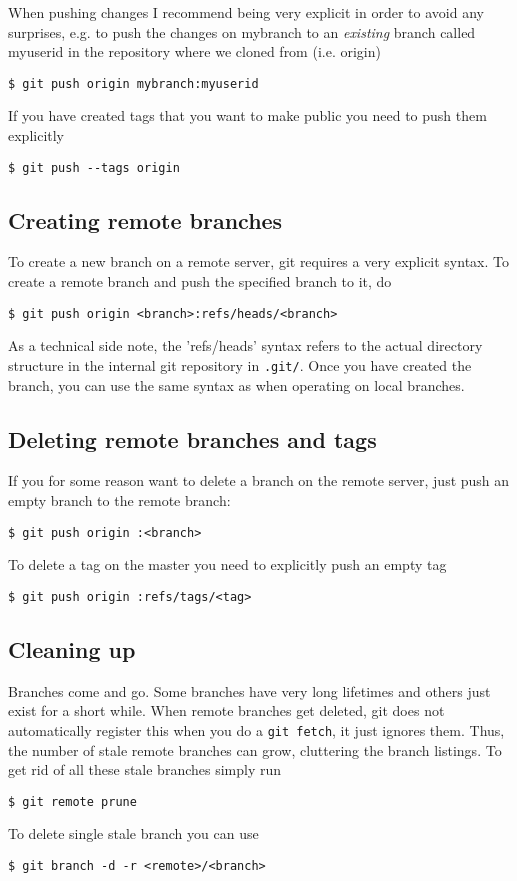 \documentclass[a4paper,10pt]{article}
\begin{document}
When pushing changes I recommend being very explicit in order to avoid any
surprises, e.g. to push the changes on mybranch to an \emph{existing} branch
called myuserid in the repository where we cloned from (i.e. origin) 
\begin{verbatim}
$ git push origin mybranch:myuserid
\end{verbatim}
If you have created tags that you want to make public you need to push them
explicitly
\begin{verbatim}
$ git push --tags origin 
\end{verbatim}

\subsection{Creating remote branches} 
To create a new branch on a remote server, git
requires a very explicit syntax. To create a remote 
branch and push the specified branch to it, do
\begin{verbatim}
$ git push origin <branch>:refs/heads/<branch>
\end{verbatim}
As a technical side note, the 'refs/heads' syntax refers to the actual
directory structure in the internal git repository in \texttt{.git/}.
Once you have created the branch, you can
use the same syntax as when operating on local branches. 

\subsection{Deleting remote branches and tags}
If you for some reason want to delete a branch
on the remote server, just push an empty branch to the remote branch:
\begin{verbatim}
$ git push origin :<branch>
\end{verbatim}

To delete a tag on the master you need to explicitly push an empty tag
\begin{verbatim}
$ git push origin :refs/tags/<tag>
\end{verbatim}

\subsection{Cleaning up}
Branches come and go. Some branches have very long lifetimes and others just
exist for a short while. When remote branches get deleted, git does not
automatically register this when you do a \texttt{git fetch}, it just ignores
them. Thus, the number of stale remote branches can grow, cluttering the
branch listings. To get rid of all these stale branches simply run 
\begin{verbatim}
$ git remote prune
\end{verbatim}
To delete single stale branch you can use
\begin{verbatim}
$ git branch -d -r <remote>/<branch>
\end{verbatim}
\end{document}
